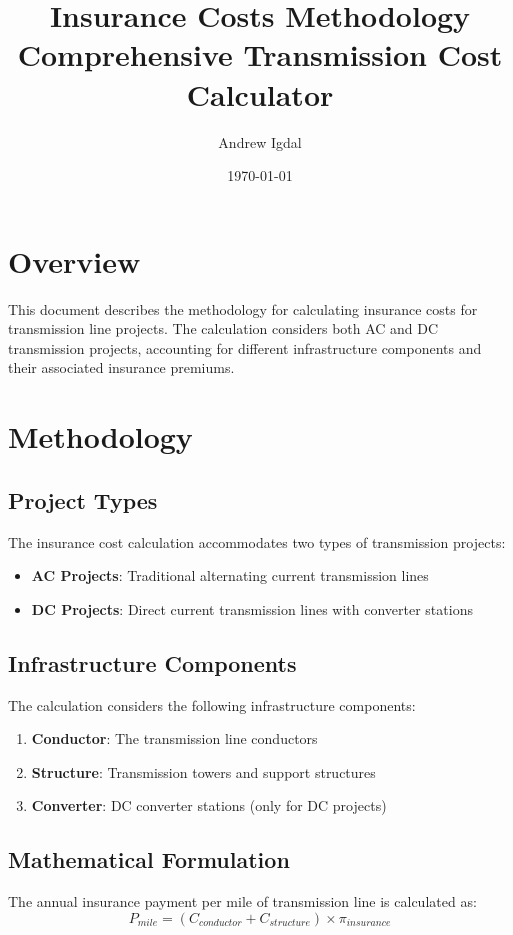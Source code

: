 \documentclass[12pt]{article}
\title{Insurance Costs Methodology\\Comprehensive Transmission Cost Calculator}
\author{Andrew Igdal}
\date{\today}
\begin{document}
\maketitle

\section{Overview}
This document describes the methodology for calculating insurance costs for transmission line projects. The calculation considers both AC and DC transmission projects, accounting for different infrastructure components and their associated insurance premiums.

\section{Methodology}

\subsection{Project Types}
The insurance cost calculation accommodates two types of transmission projects:
\begin{itemize}
    \item \textbf{AC Projects}: Traditional alternating current transmission lines
    \item \textbf{DC Projects}: Direct current transmission lines with converter stations
\end{itemize}

\subsection{Infrastructure Components}
The calculation considers the following infrastructure components:
\begin{enumerate}
    \item \textbf{Conductor}: The transmission line conductors
    \item \textbf{Structure}: Transmission towers and support structures
    \item \textbf{Converter}: DC converter stations (only for DC projects)
\end{enumerate}

\subsection{Mathematical Formulation}

The annual insurance payment per mile of transmission line is calculated as:
\begin{equation}
P_{mile} = (C_{conductor} + C_{structure}) \times \pi_{insurance}
\end{equation}
\end{document}
